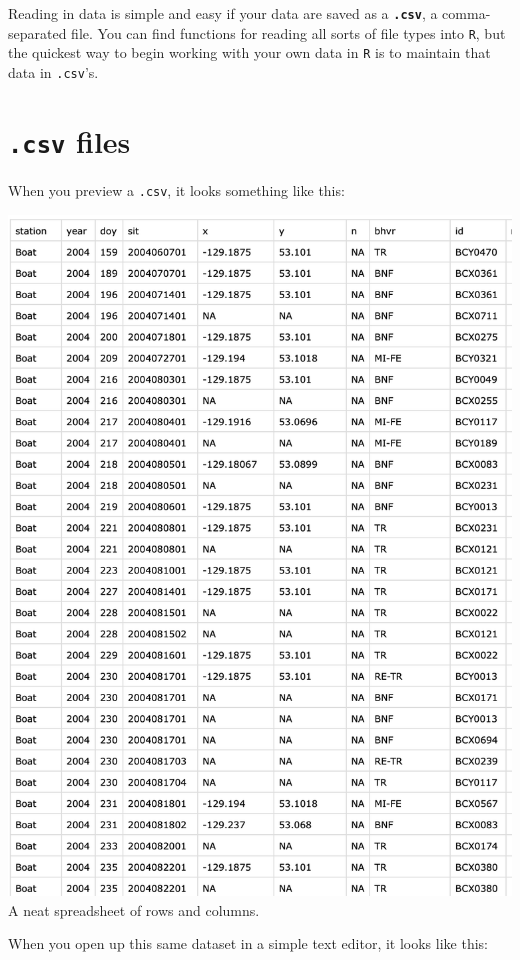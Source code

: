 \documentclass[
]{book}
\begin{document}
Reading in data is simple and easy if your data are saved as a \textbf{\texttt{.csv}}, a comma-separated file. You can find functions for reading all sorts of file types into \texttt{R}, but the quickest way to begin working with your own data in \texttt{R} is to maintain that data in \texttt{.csv}'s.

\hypertarget{csv-files}{%
\section*{\texorpdfstring{\texttt{.csv} files}{.csv files}}\label{csv-files}}

When you preview a \texttt{.csv}, it looks something like this:

\includegraphics{img/csv.png}
A neat spreadsheet of rows and columns.

When you open up this same dataset in a simple text editor, it looks like this:
\end{document}
